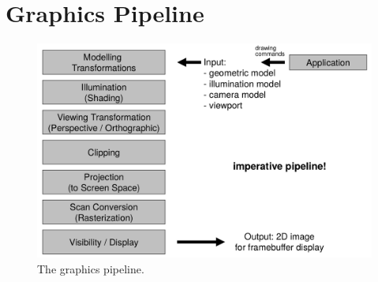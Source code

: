 \documentclass[11pt]{article}
\begin{document}
\section{Graphics Pipeline}

\begin{figure}[htb!]
  \caption{The graphics pipeline.}
  \centering
  \includegraphics[scale=0.3]{pipeline}
\end{figure}
\end{document}
